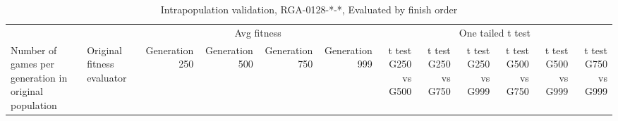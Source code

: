 \begin{landscape}
\begin{table}[ht]
  \centering
  \caption{Intrapopulation validation, RGA-0128-*-*, Evaluated by finish order}
    \begin{tabularx}{\linewidth}{|p{1in}|p{1in}|r|r|r|r|r|r|r|r|r|r|}
\cline{3-12}    \multicolumn{1}{l}{} &  & \multicolumn{4}{c|}{Avg fitness} & \multicolumn{6}{c|}{One tailed t test} \\ \cline{1-12}
    Number of games per generation in original population
    & Original fitness evaluator 
    & \multicolumn{1}{p{0.7in}|}{Generation 250} 
    & \multicolumn{1}{p{0.7in}|}{Generation 500}
    & \multicolumn{1}{p{0.7in}|}{Generation 750}
    & \multicolumn{1}{p{0.7in}|}{Generation 999}
    & \multicolumn{1}{X|}{t test G250 vs G500} 
    & \multicolumn{1}{X|}{t test G250 vs G750}
    & \multicolumn{1}{X|}{t test G250 vs G999}
    & \multicolumn{1}{X|}{t test G500 vs G750}
    & \multicolumn{1}{X|}{t test G500 vs G999}
    & \multicolumn{1}{X|}{t test G750 vs G999} \\ \cline{1-12}


\end{tabularx}
\end{table}
\end{landscape}

